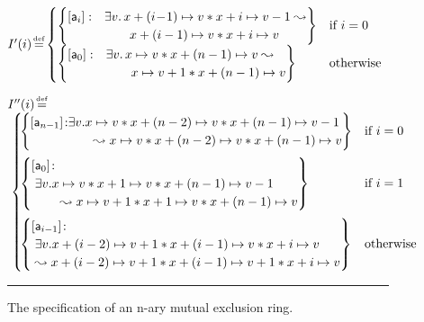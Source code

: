 \begin{figure}
\[\begin{array}{@{} l @{}}
\begin{array}{@{} l @{}}
	I'(i) \!\eqdef\! 
	\begin{cases}
		\left\{
		\begin{array}{@{} l l @{}}
			[\token{a}_{i}]: 
				&\exsts{v}\cell{x + (i\!-\!1)}{v} * \cell{x + i}{v-1} \swap\\
				&\qquad\cell{x + (i-1)}{v} * \cell{x + i}{v}
		\end{array}
		\right\}
		& \text{if } i = 0\\
		
		\left\{
		\begin{array}{@{} l l @{}}
			[\token{a}_{0}]: 
				&\exsts{v}\cell{x}{v} * \cell{x + (n-1)}{v} \swap\\
				&\qquad\cell{x}{v+1} * \cell{x + (n-1)}{v}
		\end{array}
		\right\}
		& \text{otherwise}
	\end{cases}\\\\
	
	I''(i) \!\eqdef\! \\\;
	\begin{cases}
		\!\left\{
			\begin{array}{@{} l @{} l @{}}
				[\token{a}_{n-1}]\!: & \exsts{v}\! \cell{x}{v} * \cell{x + (n-2)}{v} * \cell{x + (n-1)}{v-1} \\
				& \qquad \swap\cell{x}{v} * \cell{x + (n-2)}{v} * \cell{x + (n-1)}{v}
			\end{array}
		\right\}
		& \text{if } i = 0  \vspace*{5pt}\\
		
		\!\left\{
			\begin{array}{@{} l @{}}
				[\token{a}_{0}]\!: \\
				\;\exsts{v}\! \cell{x}{v} * \cell{x + 1}{v} * \cell{x + (n-1)}{v-1} \\
				\; \qquad \swap\cell{x}{v+1} * \cell{x + 1}{v} * \cell{x + (n-1)}{v}
			\end{array}
		\right\}
		& \text{if } i = 1 \vspace*{5pt}\\
		
		\!\left\{
			\begin{array}{@{} l @{}}
				[\token{a}_{i-1}]\!: \\
				\;\exsts{v}\! \cell{x + (i-2)}{v+1} * \cell{x + (i-1)}{v} * \cell{x + i}{v} \\
				\;\swap\cell{x + (i-2)}{v+1} * \cell{x + (i-1)}{v+1} * \cell{x + i}{v}
			\end{array}
		\right\}
		& \text{otherwise}
	\end{cases}\\
\end{array}
\end{array}
\]
\hrule
%
\caption{The \colosl specification of an n-ary mutual exclusion ring.}
\label{fig:n-place-ring-spec}
\end{figure}
%
%


